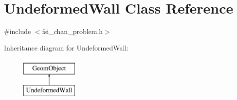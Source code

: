 \hypertarget{classUndeformedWall}{}\section{Undeformed\+Wall Class Reference}
\label{classUndeformedWall}


{\ttfamily \#include $<$fsi\+\_\+chan\+\_\+problem.\+h$>$}

Inheritance diagram for Undeformed\+Wall\+:\begin{figure}[H]
\begin{center}
\leavevmode
\includegraphics[height=2.000000cm]{classUndeformedWall}
\end{center}
\end{figure}
